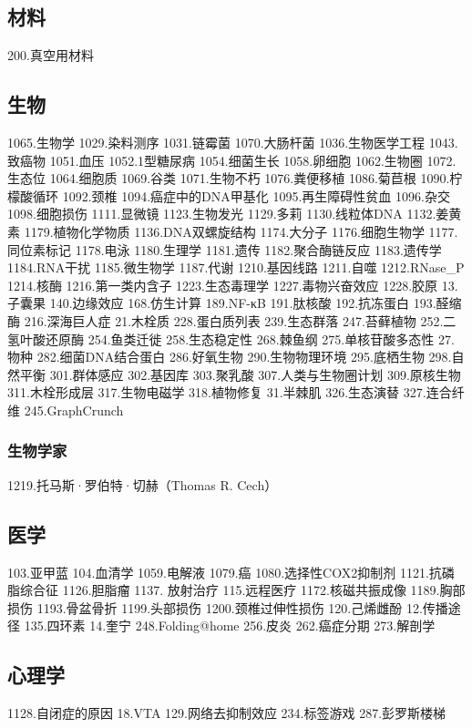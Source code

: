 \subsection{材料}
200.真空用材料

\subsection{生物}
1065.生物学
1029.染料测序
1031.链霉菌
1070.大肠杆菌
1036.生物医学工程
1043.致癌物
1051.血压
1052.1型糖尿病
1054.细菌生长
1058.卵细胞
1062.生物圈
1072.生态位
1064.细胞质
1069.谷类
1071.生物不朽
1076.粪便移植
1086.菊苣根
1090.柠檬酸循环
1092.颈椎
1094.癌症中的DNA甲基化
1095.再生障碍性贫血
1096.杂交
1098.细胞损伤
1111.显微镜
1123.生物发光
1129.多莉
1130.线粒体DNA
1132.姜黄素
1179.植物化学物质
1136.DNA双螺旋结构
1174.大分子
1176.细胞生物学
1177.同位素标记
1178.电泳
1180.生理学
1181.遗传
1182.聚合酶链反应
1183.遗传学
1184.RNA干扰
1185.微生物学
1187.代谢
1210.基因线路
1211.自噬
1212.RNase_P
1214.核酶
1216.第一类内含子
1223.生态毒理学
1227.毒物兴奋效应
1228.胶原
13.子囊果
140.边缘效应
168.仿生计算
189.NF-κB
191.肽核酸
192.抗冻蛋白
193.醛缩酶
216.深海巨人症
21.木栓质
228.蛋白质列表
239.生态群落
247.苔藓植物
252.二氢叶酸还原酶
254.鱼类迁徙
258.生态稳定性
268.棘鱼纲
275.单核苷酸多态性
27.物种
282.细菌DNA结合蛋白
286.好氧生物
290.生物物理环境
295.底栖生物
298.自然平衡
301.群体感应
302.基因库
303.聚乳酸
307.人类与生物圈计划
309.原核生物
311.木栓形成层
317.生物电磁学
318.植物修复
31.半棘肌
326.生态演替
327.连合纤维
245.GraphCrunch

\subsubsection{生物学家}
1219.托马斯·罗伯特·切赫（Thomas R. Cech）

\subsection{医学}
103.亚甲蓝
104.血清学
1059.电解液
1079.癌
1080.选择性COX2抑制剂
1121.抗磷脂综合征
1126.胆脂瘤
1137. 放射治疗
115.远程医疗
1172.核磁共振成像
1189.胸部损伤
1193.骨盆骨折
1199.头部损伤
1200.颈椎过伸性损伤
120.己烯雌酚
12.传播途径
135.四环素
14.奎宁
248.Folding@home
256.皮炎
262.癌症分期
273.解剖学

\subsection{心理学}
1128.自闭症的原因
18.VTA
129.网络去抑制效应
234.标签游戏
287.彭罗斯楼梯

